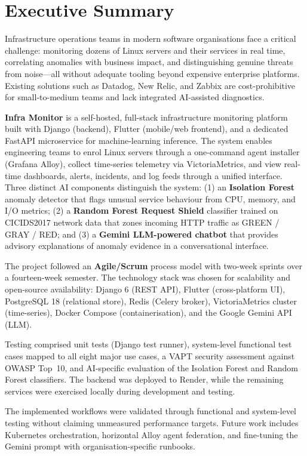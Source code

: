 \chapter*{Executive Summary}

Infrastructure operations teams in modern software organisations face a critical
challenge: monitoring dozens of Linux servers and their services in real time,
correlating anomalies with business impact, and distinguishing genuine threats
from noise---all without adequate tooling beyond expensive enterprise platforms.
Existing solutions such as Datadog, New Relic, and Zabbix are cost-prohibitive
for small-to-medium teams and lack integrated AI-assisted diagnostics.

\textbf{Infra Monitor} is a self-hosted, full-stack infrastructure monitoring
platform built with Django (backend), Flutter (mobile/web frontend), and a
dedicated FastAPI microservice for machine-learning inference.  The system
enables engineering teams to enrol Linux servers through a one-command agent
installer (Grafana Alloy), collect time-series telemetry via VictoriaMetrics,
and view real-time dashboards, alerts, incidents, and log feeds through a
unified interface.  Three distinct AI components distinguish the system: (1)
an \textbf{Isolation Forest} anomaly detector that flags unusual service
behaviour from CPU, memory, and I/O metrics; (2) a \textbf{Random Forest
Request Shield} classifier trained on CICIDS2017 network data that zones
incoming HTTP traffic as GREEN / GRAY / RED; and (3) a \textbf{Gemini
LLM-powered chatbot} that provides advisory explanations of anomaly evidence in
a conversational interface.

The project followed an \textbf{Agile/Scrum} process model with two-week
sprints over a fourteen-week semester.  The technology stack was chosen for
scalability and open-source availability: Django 6 (REST API), Flutter
(cross-platform UI), PostgreSQL 18 (relational store), Redis (Celery broker),
VictoriaMetrics cluster (time-series), Docker Compose (containerisation), and
the Google Gemini API (LLM).

Testing comprised unit tests (Django test runner), system-level functional test
cases mapped to all eight major use cases, a VAPT security assessment against
OWASP Top~10, and AI-specific evaluation of the Isolation Forest and Random
Forest classifiers.  The backend was deployed to Render, while the remaining services were exercised
locally during development and testing.

The implemented workflows were validated through functional and system-level
testing without claiming unmeasured performance targets. Future work
includes Kubernetes orchestration, horizontal Alloy agent federation, and
fine-tuning the Gemini prompt with organisation-specific runbooks.

